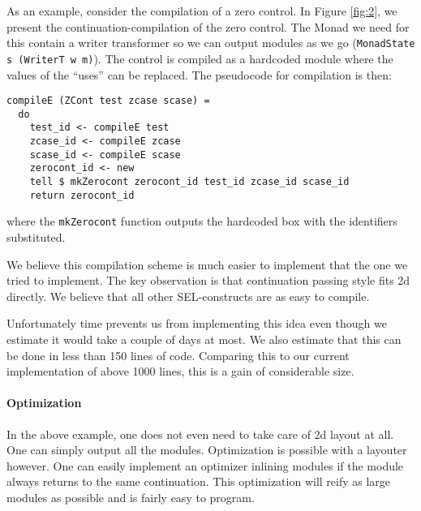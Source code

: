 As an example, consider the compilation of a zero control. In Figure
\ref{fig:2}, we present the continuation-compilation of the zero
control. The Monad we need for this contain a writer transformer so we
can output modules as we go (\texttt{MonadState s (WriterT w m)}). The
control is compiled as a hardcoded module where the values of the
``uses'' can be replaced. The pseudocode for compilation is then:
\begin{verbatim}
compileE (ZCont test zcase scase) =
  do
    test_id <- compileE test
    zcase_id <- compileE zcase
    scase_id <- compileE scase
    zerocont_id <- new
    tell $ mkZerocont zerocont_id test_id zcase_id scase_id
    return zerocont_id
\end{verbatim}
where the \texttt{mkZerocont} function outputs the hardcoded box with
the identifiers substituted.

We believe this compilation scheme is much easier to implement that
the one we tried to implement. The key observation is that
continuation passing style fits 2d directly. We believe that all other
SEL-constructs are as easy to compile.

Unfortunately time prevents us from implementing this idea even though
we estimate it would take a couple of days at most. We also estimate
that this can be done in less than 150 lines of code. Comparing this
to our current implementation of above 1000 lines, this is a gain of
considerable size.

\paragraph{Optimization}
\label{sec:optimization}

In the above example, one does not even need to take care of 2d layout
at all. One can simply output all the modules. Optimization is
possible with a layouter however. One can easily implement an
optimizer inlining modules if the module always returns to the same
continuation. This optimization will reify as large modules as
possible and is fairly easy to program.

